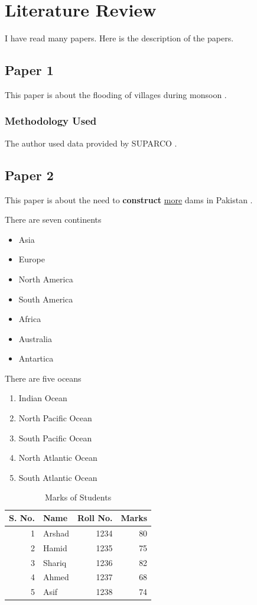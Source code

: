 \chapter{Literature Review}
\label{chap:lit_review}
I have read many papers.  Here is the description of the papers.

\section{Paper 1}
\label{sec:paper1}
This paper is about the flooding of villages during monsoon \cite{6598993}.

\subsection{Methodology Used}
The author used data provided by SUPARCO \cite{dyrbye2017impact}.


\section{Paper 2}
This paper is about the need to \textbf{construct} \underline{more} dams in Pakistan \cite{rastogi2018statistical}.

There are seven continents
\begin{itemize}
	\item Asia
	\item Europe
	\item North America
	\item South America
	\item Africa
	\item Australia
	\item Antartica
\end{itemize}

There are five oceans
\begin{enumerate}
	\item Indian Ocean
	\item North Pacific Ocean
	\item South Pacific Ocean
	\item North Atlantic Ocean
	\item South Atlantic Ocean
\end{enumerate}


\begin{table}[htbp]
  \centering
  \caption{Marks of Students}
    \begin{tabular}{|r|l|r|r|}
		\hline
    S. No. &Name& Roll No. &Marks \\
		\hline
    1     & Arshad & 1234  & 80 \\
    2     & Hamid & 1235  & 75 \\
    3     & Shariq & 1236  & 82 \\
    4     & Ahmed & 1237  & 68 \\
    5     & Asif  & 1238  & 74 \\
		\hline
		\hline
    \end{tabular}%
  \label{tab:addlabel}%
\end{table}%

